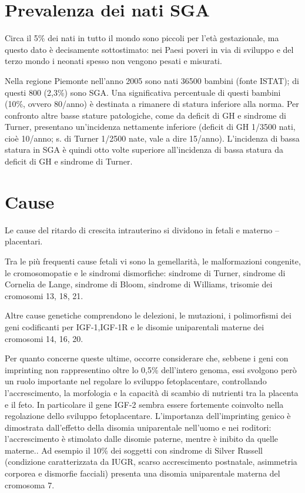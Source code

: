\section{Prevalenza dei nati SGA}

Circa il 5\% dei nati in tutto il mondo sono piccoli per l'età gestazionale, 
ma questo dato è decisamente sottostimato: nei Paesi poveri in via di sviluppo 
e del terzo mondo i neonati spesso non vengono pesati e misurati\cite{novonordisk}.

Nella regione Piemonte nell'anno 2005 sono nati 36500 bambini (fonte ISTAT); di questi 800 (2,3\%) sono SGA. Una significativa percentuale di questi bambini (10\%, ovvero 80/anno) è destinata a rimanere di statura inferiore alla norma. Per confronto altre basse stature patologiche, come da deficit di GH e sindrome di Turner, presentano un'incidenza nettamente inferiore (deficit di GH 1/3500 nati, cioè 10/anno; s. di Turner 1/2500 nate, vale a dire 15/anno). L'incidenza di bassa statura in SGA è quindi otto volte superiore all'incidenza di bassa statura da deficit di GH e sindrome di Turner. 


\section{Cause}

Le cause del ritardo di crescita intrauterino si dividono in
fetali e materno -- placentari.


Tra le più frequenti cause fetali vi sono la gemellarità, le malformazioni congenite, le cromosomopatie e le sindromi dismorfiche: sindrome di Turner, sindrome di Cornelia de Lange, sindrome di Bloom, sindrome di Williams, trisomie dei cromosomi 13, 18, 21.

Altre cause genetiche comprendono le delezioni, le mutazioni, i polimorfismi dei geni codificanti per IGF-1,IGF-1R \cite{woods1996intrauterine} \cite{vaessen2002association} \cite{arends2002polymorphism}
e le disomie uniparentali materne dei cromosomi 14, 16, 20\cite{fowden2006imprinted}.
 
Per quanto concerne queste ultime, occorre considerare che, sebbene
i geni con imprinting non rappresentino oltre lo 0,5\% dell'intero genoma, essi svolgono
però un ruolo importante nel regolare lo sviluppo fetoplacentare, controllando l'accrescimento, la 
morfologia e la capacità di scambio di nutrienti tra la placenta e il feto.
In particolare il gene IGF-2 sembra essere fortemente coinvolto nella regolazione dello sviluppo
fetoplacentare. L'importanza dell'imprinting genico è dimostrata dall'effetto della disomia uniparentale
nell'uomo e nei roditori: l'accrescimento è stimolato dalle disomie paterne, mentre \`e inibito da quelle materne.\cite{fowden2006imprinted}.
Ad esempio il 10\% dei soggetti con sindrome di Silver Russell (condizione caratterizzata da IUGR, scarso accrescimento postnatale, asimmetria corporea e dismorfie facciali) presenta una disomia uniparentale materna del cromosoma 7. 

